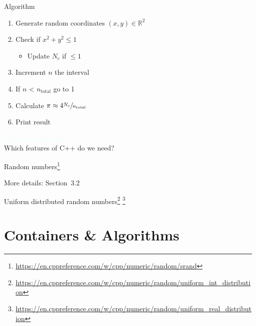\documentclass[12pt]{beamer}
\begin{document}
\begin{frame}{Algorithm}
\begin{enumerate}
\item Generate random coordinates $(x,y)\in \mathbb{R}^2$
\item Check if $x^2+y^2 \leq 1$
\begin{itemize}
\item Update $N_c$ if $\leq 1$
\end{itemize}
\item Increment $n$ the interval  
\item If $n$ < $n_{\text{total}}$ go to 1
\item Calculate $\pi \approx 4 \sfrac{N_c}{n_\text{total}}$
\item Print result
\end{enumerate}
\vspace{0.25cm}
\textcolor{azure}{Interactive question:} \\
\vspace{0.125cm}
Which features of C++ do we need? \\
\vspace{0.25cm}
\end{frame}

\begin{frame}{Random numbers\footnote{\tiny\url{https://en.cppreference.com/w/cpp/numeric/random/srand}}}


More details: Section~3.2~\cite{knuth1997art2}
\end{frame}

\begin{frame}{Uniform distributed random numbers\footnote{\tiny\url{https://en.cppreference.com/w/cpp/numeric/random/uniform_int_distribution}} \footnote{\tiny\url{https://en.cppreference.com/w/cpp/numeric/random/uniform_real_distribution}}}



\end{frame}

\section{Containers \& Algorithms}
\end{document}
